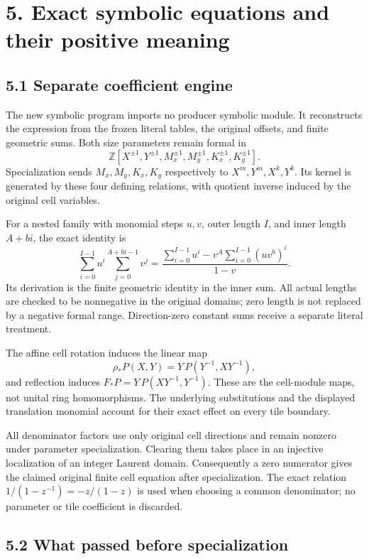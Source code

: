 \documentclass[
  11pt,
]{article}
\begin{document}
\section{5. Exact symbolic equations and their positive
meaning}\label{exact-symbolic-equations-and-their-positive-meaning}

\subsection{5.1 Separate coefficient
engine}\label{separate-coefficient-engine}

The new symbolic program imports no producer symbolic module. It
reconstructs the expression from the frozen literal tables, the original
offsets, and finite geometric sums. Both size parameters remain formal
in \[
\mathbb Z[X^{\pm1},Y^{\pm1},M_x^{\pm1},M_y^{\pm1},K_x^{\pm1},K_y^{\pm1}].
\] Specialization sends \(M_x,M_y,K_x,K_y\) respectively to
\(X^m,Y^m,X^k,Y^k\). Its kernel is generated by these four defining
relations, with quotient inverse induced by the original cell variables.

For a nested family with monomial steps \(u,v\), outer length \(I\), and
inner length \(A+bi\), the exact identity is \[
\sum_{i=0}^{I-1}u^i\sum_{j=0}^{A+bi-1}v^j
=\frac{\displaystyle\sum_{i=0}^{I-1}u^i
-v^A\displaystyle\sum_{i=0}^{I-1}(uv^b)^i}{1-v}.
\] Its derivation is the finite geometric identity in the inner sum. All
actual lengths are checked to be nonnegative in the original domains;
zero length is not replaced by a negative formal range. Direction-zero
constant sums receive a separate literal treatment.

The affine cell rotation induces the linear map \[
\rho_*P(X,Y)=Y\,P(Y^{-1},XY^{-1}),
\] and reflection induces \(F_*P=Y\,P(XY^{-1},Y^{-1})\). These are the
cell-module maps, not unital ring homomorphisms. The underlying
substitutions and the displayed translation monomial account for their
exact effect on every tile boundary.

All denominator factors use only original cell directions and remain
nonzero under parameter specialization. Clearing them takes place in an
injective localization of an integer Laurent domain. Consequently a zero
numerator gives the claimed original finite cell equation after
specialization. The exact relation \(1/(1-z^{-1})=-z/(1-z)\) is used
when choosing a common denominator; no parameter or tile coefficient is
discarded.

\subsection{5.2 What passed before
specialization}\label{what-passed-before-specialization}
\end{document}
